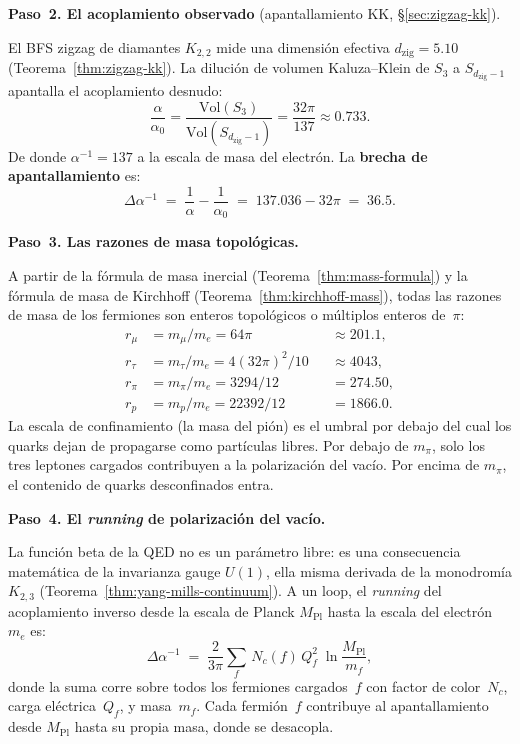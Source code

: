 \documentclass[11pt, a4paper, openany]{book}
\begin{document}
\bigskip
\noindent
\textbf{Paso~2. El acoplamiento observado} (apantallamiento KK,
\S\ref{sec:zigzag-kk}).

\medskip\noindent
El BFS zigzag de diamantes $K_{2,2}$ mide una dimensi\'on efectiva
$d_{\mathrm{zig}} = 5.10$
(Teorema~\ref{thm:zigzag-kk}). La diluci\'on de volumen
Kaluza--Klein de $S_3$ a $S_{d_{\mathrm{zig}}-1}$ apantalla el
acoplamiento desnudo:
\begin{equation}
  \frac{\alpha}{\alpha_0}
  = \frac{\mathrm{Vol}(S_3)}{\mathrm{Vol}(S_{d_{\mathrm{zig}}-1})}
  = \frac{32\pi}{137}
  \approx 0.733.
  \tag{$M$-V.2}
\end{equation}
De donde $\alpha^{-1} = 137$ a la escala de masa del electr\'on. La
\textbf{brecha de apantallamiento} es:
\begin{equation}
  \Delta\alpha^{-1}
  \;=\; \frac{1}{\alpha} - \frac{1}{\alpha_0}
  \;=\; 137.036 - 32\pi
  \;=\; 36.5.
  \tag{$M$-V.3}
\end{equation}

\bigskip
\noindent
\textbf{Paso~3. Las razones de masa topol\'ogicas.}

\medskip\noindent
A partir de la f\'ormula de masa inercial (Teorema~\ref{thm:mass-formula})
y la f\'ormula de masa de Kirchhoff (Teorema~\ref{thm:kirchhoff-mass}),
todas las razones de masa de los fermiones son enteros topol\'ogicos o
m\'ultiplos enteros de~$\pi$:
\begin{equation}
\begin{aligned}
  r_\mu &= m_\mu/m_e = 64\pi &&\approx 201.1, \\
  r_\tau &= m_\tau/m_e = 4(32\pi)^2/10 &&\approx 4043, \\
  r_\pi &= m_\pi/m_e = 3294/12 &&= 274.50, \\
  r_p &= m_p/m_e = 22392/12 &&= 1866.0.
\end{aligned}
  \tag{$M$-V.4}
\end{equation}
La escala de confinamiento (la masa del pi\'on) es el umbral por debajo
del cual los quarks dejan de propagarse como part\'iculas libres. Por
debajo de $m_\pi$, solo los tres leptones cargados contribuyen a la
polarizaci\'on del vac\'io. Por encima de $m_\pi$, el contenido de
quarks desconfinados entra.

\bigskip
\noindent
\textbf{Paso~4. El \emph{running} de polarizaci\'on del vac\'io.}

\medskip\noindent
La funci\'on beta de la QED no es un par\'ametro libre: es una
consecuencia matem\'atica de la invarianza gauge $U(1)$, ella misma
derivada de la monodrom\'ia $K_{2,3}$
(Teorema~\ref{thm:yang-mills-continuum}). A un loop, el \emph{running}
del acoplamiento inverso desde la escala de Planck $M_{\mathrm{Pl}}$
hasta la escala del electr\'on $m_e$ es:
\begin{equation}
  \Delta\alpha^{-1}
  \;=\; \frac{2}{3\pi}\sum_{f}\, N_c(f)\, Q_f^2
  \;\ln\frac{M_{\mathrm{Pl}}}{m_f},
  \tag{$M$-V.5}
  \label{eq:rg-running}
\end{equation}
donde la suma corre sobre todos los fermiones cargados~$f$ con factor
de color~$N_c$, carga el\'ectrica~$Q_f$, y masa~$m_f$. Cada
fermi\'on~$f$ contribuye al apantallamiento desde $M_{\mathrm{Pl}}$
hasta su propia masa, donde se desacopla.
\end{document}
